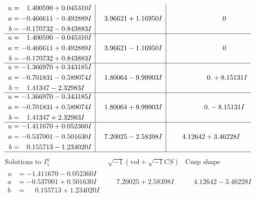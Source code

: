 \documentclass[1p]{elsarticle_modified}
\theoremstyle{definition}
\newcommand{\I}{\sqrt{-1}}
\begin{document}
$$\begin{array}{c|c|c}
\begin{aligned}
u &= \phantom{-}1.400590 + 0.045310 I \\
a &= -0.466611 - 0.492889 I \\
b &= -0.170732 - 0.843883 I\end{aligned}
 & \phantom{-}3.96621 + 1.16950 I & \phantom{-0.000000 } 0 \\ \hline\begin{aligned}
u &= \phantom{-}1.400590 - 0.045310 I \\
a &= -0.466611 + 0.492889 I \\
b &= -0.170732 + 0.843883 I\end{aligned}
 & \phantom{-}3.96621 - 1.16950 I & \phantom{-0.000000 } 0 \\ \hline\begin{aligned}
u &= -1.366970 + 0.343185 I \\
a &= -0.701831 - 0.589074 I \\
b &= \phantom{-}1.41347 - 2.32983 I\end{aligned}
 & \phantom{-}1.80064 - 9.99903 I & \phantom{-0.000000 -}0. + 8.15131 I \\ \hline\begin{aligned}
u &= -1.366970 - 0.343185 I \\
a &= -0.701831 + 0.589074 I \\
b &= \phantom{-}1.41347 + 2.32983 I\end{aligned}
 & \phantom{-}1.80064 + 9.99903 I & \phantom{-0.000000 } 0. - 8.15131 I \\ \hline\begin{aligned}
u &= -1.411670 + 0.052360 I \\
a &= -0.537001 - 0.501630 I \\
b &= \phantom{-}0.155713 - 1.234020 I\end{aligned}
 & \phantom{-}7.20025 - 2.58398 I & \phantom{-}4.12642 + 3.46228 I\\
 \hline 
 \end{array}$$\newpage$$\begin{array}{c|c|c}  
\text{Solutions to }I^u_{1}& \I (\text{vol} + \sqrt{-1}CS) & \text{Cusp shape}\\
 \hline 
\begin{aligned}
u &= -1.411670 - 0.052360 I \\
a &= -0.537001 + 0.501630 I \\
b &= \phantom{-}0.155713 + 1.234020 I\end{aligned}
 & \phantom{-}7.20025 + 2.58398 I & \phantom{-}4.12642 - 3.46228 I \\ \hline\begin{aligned}

\end{aligned}
\end{array}$$
\end{document}
